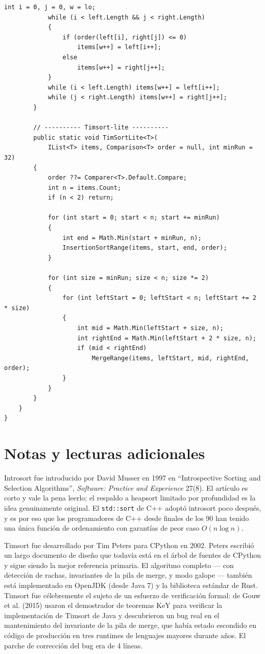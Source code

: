 \documentclass[11pt,a4paper]{article}
\begin{document}
\begin{lstlisting}[caption={\texttt{Practice.cs} --- introsort-lite y Timsort-lite}]
            int i = 0, j = 0, w = lo;
            while (i < left.Length && j < right.Length)
            {
                if (order(left[i], right[j]) <= 0)
                    items[w++] = left[i++];
                else
                    items[w++] = right[j++];
            }
            while (i < left.Length) items[w++] = left[i++];
            while (j < right.Length) items[w++] = right[j++];
        }

        // ---------- Timsort-lite ----------
        public static void TimSortLite<T>(
            IList<T> items, Comparison<T> order = null, int minRun = 32)
        {
            order ??= Comparer<T>.Default.Compare;
            int n = items.Count;
            if (n < 2) return;

            for (int start = 0; start < n; start += minRun)
            {
                int end = Math.Min(start + minRun, n);
                InsertionSortRange(items, start, end, order);
            }

            for (int size = minRun; size < n; size *= 2)
            {
                for (int leftStart = 0; leftStart < n; leftStart += 2 * size)
                {
                    int mid = Math.Min(leftStart + size, n);
                    int rightEnd = Math.Min(leftStart + 2 * size, n);
                    if (mid < rightEnd)
                        MergeRange(items, leftStart, mid, rightEnd, order);
                }
            }
        }
    }
}
\end{lstlisting}

\section{Notas y lecturas adicionales}

Introsort fue introducido por David Musser en 1997 en ``Introspective Sorting and Selection Algorithms'', \emph{Software: Practice and Experience} 27(8). El artículo es corto y vale la pena leerlo; el respaldo a heapsort limitado por profundidad es la idea genuinamente original. El \texttt{std::sort} de C++ adoptó introsort poco después, y es por eso que los programadores de C++ desde finales de los 90 han tenido una única función de ordenamiento con garantías de peor caso $O(n \log n)$.

Timsort fue desarrollado por Tim Peters para CPython en 2002. Peters escribió un largo documento de diseño que todavía está en el árbol de fuentes de CPython y sigue siendo la mejor referencia primaria. El algoritmo completo --- con detección de rachas, invariantes de la pila de merge, y modo galope --- también está implementado en OpenJDK (desde Java 7) y la biblioteca estándar de Rust. Timsort fue célebremente el sujeto de un esfuerzo de verificación formal: de Gouw et al. (2015) usaron el demostrador de teoremas KeY para verificar la implementación de Timsort de Java y descubrieron un bug real en el mantenimiento del invariante de la pila de merge, que había estado escondido en código de producción en tres runtimes de lenguajes mayores durante años. El parche de corrección del bug era de 4 líneas.
\end{document}

